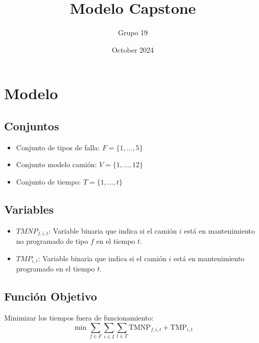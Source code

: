 \documentclass{article}
\title{Modelo Capstone}
\author{Grupo 19}
\date{October 2024}
\begin{document}
\maketitle

\section{Modelo}

\subsection{Conjuntos}
\begin{itemize}
    \item Conjunto de tipos de falla: $F = \{1, \ldots, 5\}$
    \item Conjunto modelo camión: $V = \{1, \ldots, 12\}$
    \item Conjunto de tiempo: $T = \{1, \ldots, t\}$
\end{itemize}

\subsection{Variables}
\begin{itemize}
    \item $TMNP_{f,i,t}$: Variable binaria que indica si el camión $i$ está en mantenimiento no programado de tipo $f$ en el tiempo $t$.
    
    \item $TMP_{i,t}$: Variable binaria que indica si el camión $i$ está en mantenimiento programado en el tiempo $t$.
\end{itemize}



\subsection{Función Objetivo}
Minimizar los tiempos fuera de funcionamiento:
\[
\min \sum_{f \in F} \sum_{i \in I} \sum_{t \in T} \text{TMNP}_{f,i,t} + \text{TMP}_{i,t}
\]
\end{document}
